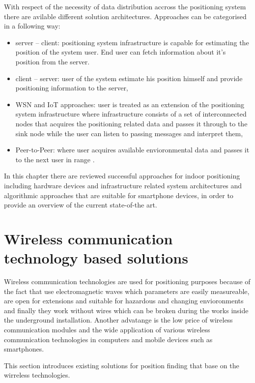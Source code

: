 \documentclass[../main.tex]{subfiles}
\begin{document}
With respect of the necessity of data distribution accross the positioning system there are avilable different solution architectures. Approaches can be categorised in a following way:
\begin{itemize}
	\item server -- client: positioning system infrastructure is capable for estimating the position of the system user. End user can fetch information about it's position from the server.
	\item client -- server: user of the system estimate his position himself and provide positioning information to the server,
	\item WSN and IoT approaches: user is treated as an extension of the positioning system infrastructure where infrastructure consists of a set of interconnected nodes that acquires the positioning related data and passes it through to the sink node while the user can listen to passing messages and interpret them,
	\item Peer-to-Peer: where user acquires available envioronmental data and passes it to the next user in range \cite{article_p2p_network_tracking_rfid}.
\end{itemize}

In this chapter there are reviewed successful approaches for indoor positioning including hardware devices and infrastructure related system architectures and algorithmic approaches that are suitable for smartphone devices, in order to provide an overview of the current state-of-the art.

\section{Wireless communication technology based solutions}
\label{sec:wireless_comm_tech_solutions}

Wireless communication technologies are used for positioning purposes because of the fact that use electromagnetic waves which parameters are easily measureable, are open for extensions and suitable for hazardous and changing envioronments and finally they work without wires which can be broken during the works inside the underground installation. Another advatange is the low price of wireless communication modules and the wide application of various wireless communication technologies in computers and mobile devices such as smartphones.

This section introduces existing solutions for position finding that base on the wirreless technologies.
\end{document}
